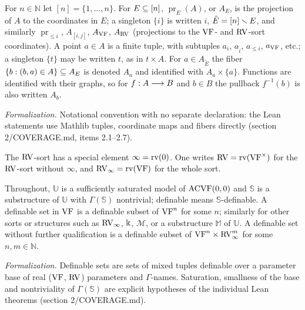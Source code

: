 \setcounter{theorem}{0}
\begin{definition}
\label{indexing}
For $n \in \mathbb{N}$ let $[n] = \{1, \ldots, n\}$. For $E \subseteq [n]$, $\operatorname{pr}_E(A)$, or $A_E$, is the projection of $A$ to the coordinates in $E$; a singleton $\{i\}$ is written $i$, $\tilde E = [n] \smallsetminus E$, and similarly $\operatorname{pr}_{\leq i}$, $A_{[i,j]}$, $A_{\mathrm{VF}}$, $A_{\mathrm{RV}}$ (projections to the $\mathrm{VF}$- and $\mathrm{RV}$-sort coordinates). A point $a \in A$ is a finite tuple, with subtuples $a_i$, $a_{\tilde i}$, $a_{\leq i}$, $a_{\mathrm{VF}}$, etc.; a singleton $\{t\}$ may be written $t$, as in $t \times A$. For $a \in A_{\tilde E}$ the fiber $\{b : (b,a) \in A\} \subseteq A_E$ is denoted $A_a$ and identified with $A_a \times \{a\}$. Functions are identified with their graphs, so for $f : A \longrightarrow B$ and $b \in B$ the pullback $f^{-1}(b)$ is also written $A_b$.

\emph{Formalization.} Notational convention with no separate declaration: the Lean statements use Mathlib tuples, coordinate maps and fibers directly (section 2/COVERAGE.md, items 2.1--2.7).
\end{definition}

\setcounter{theorem}{1}
\begin{definition}
\label{s2-rv-infinity}
\leanok
The $\mathrm{RV}$-sort has a special element $\infty = \operatorname{rv}(0)$. One writes $\mathrm{RV} = \operatorname{rv}(\mathrm{VF}^\times)$ for the $\mathrm{RV}$-sort without $\infty$, and $\mathrm{RV}_\infty = \operatorname{rv}(\mathrm{VF})$ for the whole sort.
\end{definition}

\setcounter{theorem}{2}
\begin{definition}
\label{nota-sub}
\leanok
{}
Throughout, $\mathbb{U}$ is a sufficiently saturated model of $\mathrm{ACVF}(0,0)$ and $\mathbb{S}$ is a substructure of $\mathbb{U}$ with $\Gamma(\mathbb{S})$ nontrivial; definable means $\mathbb{S}$-definable. A definable set in $\mathrm{VF}$ is a definable subset of $\mathrm{VF}^n$ for some $n$; similarly for other sorts or structures such as $\mathrm{RV}_\infty$, $\Bbbk$, $\mathcal{M}$, or a substructure $\mathbb{M}$ of $\mathbb{U}$. A definable set without further qualification is a definable subset of $\mathrm{VF}^n \times \mathrm{RV}_\infty^m$ for some $n, m \in \mathbb{N}$.

\emph{Formalization.} Definable sets are sets of mixed tuples definable over a parameter base of real ($\mathrm{VF}$, $\mathrm{RV}$) parameters and $\Gamma$-names. Saturation, smallness of the base and nontriviality of $\Gamma(\mathbb{S})$ are explicit hypotheses of the individual Lean theorems (section 2/COVERAGE.md).
\end{definition}

